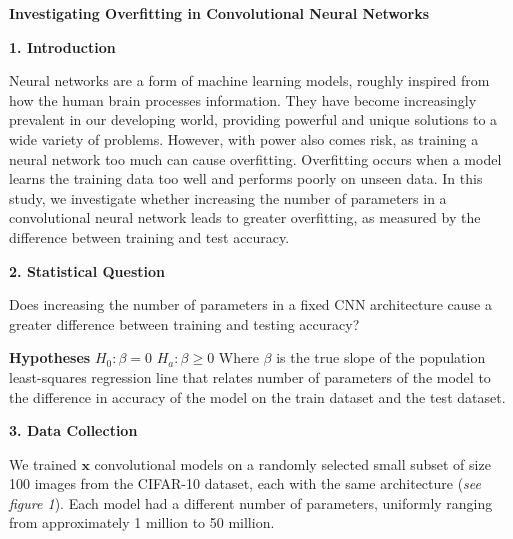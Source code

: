 \documentclass[12pt]{article}
\begin{document}
    \centerline{\textbf{Investigating Overfitting in Convolutional Neural Networks}}

    \noindent\textbf{1. Introduction}

    Neural networks are a form of machine learning models, roughly inspired from how the human brain processes information.
    They have become increasingly prevalent in our developing world, providing powerful and unique solutions to a wide variety of problems.
    However, with power also comes risk, as training a neural network too much can cause overfitting.
    Overfitting occurs when a model learns the training data too well and performs poorly on unseen data.
    In this study, we investigate whether increasing the number of parameters in a convolutional neural network
    leads to greater overfitting, as measured by the difference between training and test accuracy.

    \noindent\textbf{2. Statistical Question}

    Does increasing the number of parameters in a fixed CNN architecture cause a greater difference between training and testing accuracy?

    \noindent\textbf{Hypotheses}\newline
    $H_0: \beta = 0$ \newline
    $H_a: \beta \geq 0$
    \newline \newline
    Where $\beta$ is the true slope of the population least-squares regression line that relates number of parameters of the model to the difference in accuracy of the model on the train dataset and the test dataset.

    \noindent\textbf{3. Data Collection}

    We trained $\mathbf{x}$ convolutional models on a randomly selected small subset of size 100 images from the CIFAR-10 dataset, each with the same architecture (\textit{see figure 1}).
    Each model had a different number of parameters, uniformly ranging from approximately 1 million to 50 million.
\end{document}
